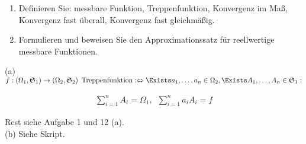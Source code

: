 
\begin{exercise}

\begin{enumerate}[label = (\alph*)]

  \item
  Definieren Sie: messbare Funktion, Treppenfunktion, Konvergenz im Maß, Konvergenz fast überall, Konvergenz fast gleichmäßig.
  
  \item
  Formulieren und beweisen Sie den Approximationssatz für reellwertige messbare Funktionen.

\end{enumerate}

\end{exercise}


\begin{solution}

\phantom{}

(a) $f: (\Omega_1, \mathfrak{S}_1) \to (\Omega_2, \mathfrak{S}_2) \enspace \text{Treppenfunktion}
: \Leftrightarrow
\Exists a_1, \ldots, a_n \in \Omega_2,
\Exists A_1, \ldots, A_n \in \mathfrak{S}_1:$

\begin{align*}
  \sum_{i=1}^n A_i = \Omega_1, \enspace
  \sum_{i=1}^n a_i A_i = f
\end{align*}

Rest siehe Aufgabe 1 und 12 (a). \\

(b) Siehe Skript.

\end{solution}

